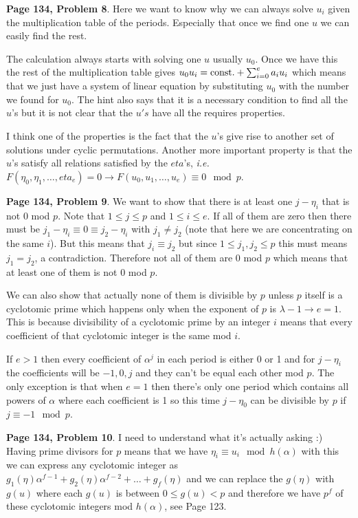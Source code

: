 \documentclass[aps,preprint,preprintnumbers,nofootinbib,showpacs,prd]{revtex4-1}
\newcommand{\ie}{{\it i.e.} }
\begin{document}
{\bf Page 134, Problem 8}. Here we want to know why we can always solve $u_i$ given the multiplication table of the periods. Especially that once we find one $u$ we can easily find the rest.

The calculation always starts with solving one $u$ usually $u_0$. Once we have this the rest of the multiplication table gives
$u_0u_i = {\rm const.} + \sum_{i=0}^e a_i u_i$ which means that we just have a system of linear equation by substituting $u_0$ with the number we found for $u_0$. The hint also says that it is a necessary condition to find all the $u$'s but it is not clear that the $u's$ have all the requires properties.

I think one of the properties is the fact that the $u$'s give rise to another set of solutions under cyclic permutations. Another more important property is that the $u$'s satisfy all relations satisfied by the $eta$'s, \ie $F(\eta_0,\eta_1,\dots,eta_e) = 0 \to F(u_0, u_1, \dots, u_e) \equiv 0 \mod p$.

{\bf Page 134, Problem 9}. We want to show that there is at least one $j - \eta_i$ that is not $0$ mod $p$. Note that $1 \le j \le p$ and $1 \le i \le e$. If all of them are zero then there must be $j_1 - \eta_i \equiv 0 \equiv j_2 - \eta_i$ with $j_1 \neq j_2$ (note that here we are concentrating on the same $i$). But this means that $j_i \equiv j_2$ but since $1 \le j_1, j_2 \le p$ this must means $j_1 = j_2$, a contradiction. Therefore not all of them are 0 mod $p$ which means that at least one of them is not 0 mod $p$.

We can also show that actually none of them is divisible by $p$ unless $p$ itself is a cyclotomic prime which happens only when the exponent of $p$ is $\lambda - 1 \to e = 1$. This is because divisibility of a cyclotomic prime by an integer $i$ means that every coefficient of that cyclotomic integer is the same mod $i$. 

If $e > 1$ then every coefficient of $\alpha^j$ in each period is either 0 or 1 and for $j - \eta_i$ the coefficients will be $-1,0, j$ and they can't be equal each other mod $p$. The only exception is that when $e = 1$ then there's only one period which contains all powers of $\alpha$ where each coefficient is 1 so this time $j -\eta_0$ can be divisible by $p$ if $j \equiv -1 \mod{p}$. 

{\bf Page 134, Problem 10}. I need to understand what it's actually asking :) Having prime divisors for $p$ means that we have $\eta_i \equiv u_i \mod h(\alpha)$ with this we can express any cyclotomic integer as $g_1(\eta) \alpha^{f-1} + g_2(\eta) \alpha^{f - 2} + \dots + g_f(\eta)$ and we can replace the $g(\eta)$ with $g(u)$ where each $g(u)$ is between $0 \le g(u) < p$ and therefore we have $p^f$ of these cyclotomic integers mod $h(\alpha)$, see Page 123.
\end{document}
